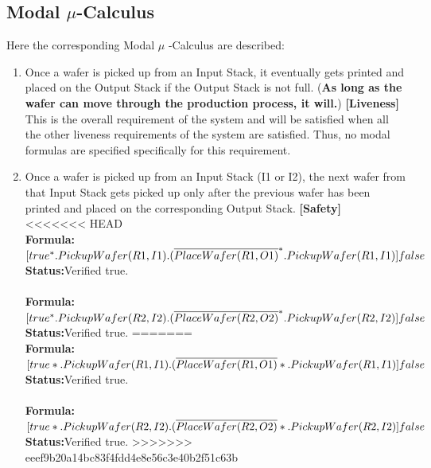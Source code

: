 \documentclass[a4paper,12pt]{article}
\begin{document}
	\subsection{Modal $\mu$-Calculus}
	Here the corresponding Modal $\mu$ -Calculus are described:
	\begin{enumerate}
		\item Once a wafer is picked up from an Input Stack, it eventually gets printed and placed on the Output Stack if the Output Stack is not full. (\textbf{As long as the wafer can move through the production process, it will.}) \textbf{[Liveness]}
		\\
		This is the overall requirement of the system and will be satisfied when all the other liveness requirements of the system are satisfied. Thus, no modal formulas are specified specifically for this requirement.
		
		\item Once a wafer is picked up from an Input Stack (I1 or I2), the next wafer from that Input Stack gets picked up only after the previous wafer has been printed and placed on the corresponding Output Stack. \textbf{[Safety]}
		\\
<<<<<<< HEAD
		\\\textbf{Formula:} $[true^*.PickupWafer(R1, I1) \\.(\overline{PlaceWafer(R1,O1)}^*.PickupWafer(R1,I1)]false$ \\\textbf{Status:}Verified true.
		\\
		\\\textbf{Formula:} $[true^*.PickupWafer(R2, I2)
		\\.(\overline{PlaceWafer(R2,O2)}^*.PickupWafer(R2,I2)]false$ \\\textbf{Status:}Verified true.
=======
		\\\textbf{Formula:} $[true*.PickupWafer(R1, I1) \\.(\overline{PlaceWafer(R1,O1)}*.PickupWafer(R1,I1)]false$ \\\textbf{Status:}Verified true.
		\\
		\\\textbf{Formula:} $[true*.PickupWafer(R2, I2)
		\\.(\overline{PlaceWafer(R2,O2)}*.PickupWafer(R2,I2)]false$ \\\textbf{Status:}Verified true.
>>>>>>> eeef9b20a14bc83f4fdd4e8e56c3e40b2f51c63b
		

\end{enumerate}
\end{document}
